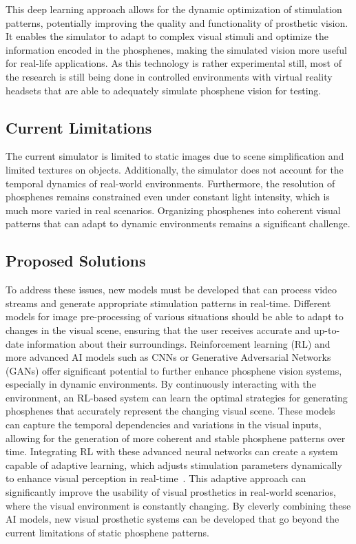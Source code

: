 \documentclass[10pt]{article}
\begin{document}
This deep learning approach allows for the dynamic optimization of stimulation
patterns, potentially improving the quality and functionality of prosthetic
vision. It enables the simulator to adapt to complex visual stimuli and optimize
the information encoded in the phosphenes, making the simulated vision more
useful for real-life applications. As this technology is rather experimental
still, most of the research is still being done in controlled environments with
virtual reality headsets that are able to adequately simulate phosphene vision
for testing.

\subsection*{Current Limitations}\label{subsec:limitations}
The current simulator is limited to static images due to scene simplification and limited textures on objects. Additionally, the simulator does not account for the temporal dynamics of real-world environments. Furthermore, the resolution of phosphenes remains constrained even under constant light intensity, which is much more varied in real scenarios. Organizing phosphenes into coherent visual patterns that can adapt to dynamic environments remains a significant challenge.

\subsection*{Proposed Solutions}\label{subsec:solutions}
To address these issues, new models must be developed that can process video
streams and generate appropriate stimulation patterns in real-time. Different
models for image pre-processing of various situations should be able to adapt to
changes in the visual scene, ensuring that the user receives accurate and
up-to-date information about their surroundings. Reinforcement learning (RL) and
more advanced AI models such as CNNs or Generative Adversarial Networks (GANs)
offer significant potential to further enhance phosphene vision systems,
especially in dynamic environments. By continuously interacting with the
environment, an RL-based system can learn the optimal strategies for generating
phosphenes that accurately represent the changing visual scene. These models can
capture the temporal dependencies and variations in the visual inputs, allowing
for the generation of more coherent and stable phosphene patterns over time.
Integrating RL with these advanced neural networks can create a system capable
of adaptive learning, which adjusts stimulation parameters dynamically to
enhance visual perception in real-time~\parencite{hanDeepLearningBased2021}.
This adaptive approach can significantly improve the usability of visual
prosthetics in real-world scenarios, where the visual environment is constantly
changing. By cleverly combining these AI models, new visual prosthetic systems
can be developed that go beyond the current limitations of static phosphene
patterns.
\end{document}
